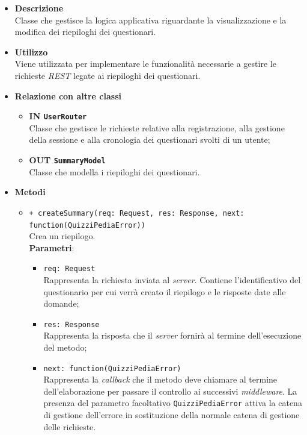 \begin{itemize}
	\item \textbf{Descrizione} \\
	Classe che gestisce la logica applicativa riguardante la visualizzazione e la modifica dei riepiloghi dei questionari.
	\item \textbf{Utilizzo} \\
	Viene utilizzata per implementare le funzionalità necessarie a gestire le richieste \textit{REST} legate ai riepiloghi dei questionari.
	\item \textbf{Relazione con altre classi}\\
	\begin{itemize}
			\item \textbf{IN \texttt{UserRouter}} \\
			Classe che gestisce le richieste relative alla registrazione, alla gestione della sessione e alla cronologia dei questionari svolti di un utente;
			\item \textbf{OUT \texttt{SummaryModel}} \\
			Classe che modella i riepiloghi dei questionari.
	\end{itemize}
	\item \textbf{Metodi}\\
	\begin{itemize}
		\item \texttt{+ createSummary(req: Request, res: Response, next: \\function(QuizziPediaError))}\\
		Crea un riepilogo.\\
		\textbf{Parametri}:
		\begin{itemize}
			\item \texttt{req: Request}\\
			Rappresenta la richiesta inviata al \textit{server}. Contiene l'identificativo del questionario per cui verrà creato il riepilogo e le risposte date alle domande;
			\item \texttt{res: Response}\\
			Rappresenta la risposta che il \textit{server} fornirà al termine dell'esecuzione del metodo;
			\item \texttt{next: function(QuizziPediaError)}\\
			Rappresenta la \textit{callback} che il metodo deve chiamare al termine dell'elaborazione per passare il controllo ai successivi \textit{middleware}. La presenza del parametro facoltativo \texttt{QuizziPediaError} attiva la catena di gestione dell'errore in sostituzione della normale catena di gestione delle richieste.
		\end{itemize}
	\end{itemize}
\end{itemize}
